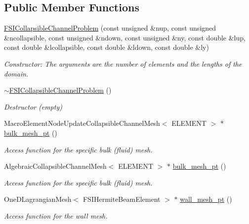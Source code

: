 \subsection*{Public Member Functions}
\begin{DoxyCompactItemize}
\item 
\hyperlink{classFSICollapsibleChannelProblem_afe14ae0d2bdfc9a15969c9bdcd6e2512}{F\+S\+I\+Collapsible\+Channel\+Problem} (const unsigned \&nup, const unsigned \&ncollapsible, const unsigned \&ndown, const unsigned \&ny, const double \&lup, const double \&lcollapsible, const double \&ldown, const double \&ly)
\begin{DoxyCompactList}\small\item\em Constructor\+: The arguments are the number of elements and the lengths of the domain. \end{DoxyCompactList}\item 
\hyperlink{classFSICollapsibleChannelProblem_abe33aaaae15ea3eb10885527a1d1ad9a}{$\sim$\+F\+S\+I\+Collapsible\+Channel\+Problem} ()
\begin{DoxyCompactList}\small\item\em Destructor (empty) \end{DoxyCompactList}\item 
Macro\+Element\+Node\+Update\+Collapsible\+Channel\+Mesh$<$ E\+L\+E\+M\+E\+NT $>$ $\ast$ \hyperlink{classFSICollapsibleChannelProblem_a5ea2780b4f97b65b5c122a952093e6c2}{bulk\+\_\+mesh\+\_\+pt} ()
\begin{DoxyCompactList}\small\item\em Access function for the specific bulk (fluid) mesh. \end{DoxyCompactList}\item 
Algebraic\+Collapsible\+Channel\+Mesh$<$ E\+L\+E\+M\+E\+NT $>$ $\ast$ \hyperlink{classFSICollapsibleChannelProblem_a9b461f3afef3185ea0b461714675ef8f}{bulk\+\_\+mesh\+\_\+pt} ()
\begin{DoxyCompactList}\small\item\em Access function for the specific bulk (fluid) mesh. \end{DoxyCompactList}\item 
One\+D\+Lagrangian\+Mesh$<$ F\+S\+I\+Hermite\+Beam\+Element $>$ $\ast$ \hyperlink{classFSICollapsibleChannelProblem_ae8b71da8da82f3c52387052ce400b930}{wall\+\_\+mesh\+\_\+pt} ()
\begin{DoxyCompactList}\small\item\em Access function for the wall mesh. \end{DoxyCompactList}\item 

\end{DoxyCompactItemize}
